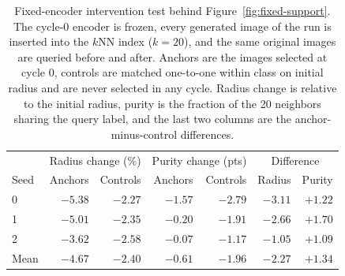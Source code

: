 \begin{table}[t]
\centering
\small
\setlength{\tabcolsep}{5pt}
\caption{Fixed-encoder intervention test behind Figure~\ref{fig:fixed-support}. The cycle-0 encoder is frozen, every generated image of the run is inserted into the $k$NN index ($k=20$), and the same original images are queried before and after. Anchors are the images selected at cycle 0, controls are matched one-to-one within class on initial radius and are never selected in any cycle. Radius change is relative to the initial radius, purity is the fraction of the 20 neighbors sharing the query label, and the last two columns are the anchor-minus-control differences.}
\label{tab:fixed-support}
\begin{tabular}{lrrrrrr}
\toprule
 & \multicolumn{2}{c}{Radius change (\%)} & \multicolumn{2}{c}{Purity change (pts)} & \multicolumn{2}{c}{Difference} \\
Seed & Anchors & Controls & Anchors & Controls & Radius & Purity \\
\midrule
0 & $-5.38$ & $-2.27$ & $-1.57$ & $-2.79$ & $-3.11$ & $+1.22$ \\
1 & $-5.01$ & $-2.35$ & $-0.20$ & $-1.91$ & $-2.66$ & $+1.70$ \\
2 & $-3.62$ & $-2.58$ & $-0.07$ & $-1.17$ & $-1.05$ & $+1.09$ \\
\midrule
Mean & $-4.67$ & $-2.40$ & $-0.61$ & $-1.96$ & $-2.27$ & $+1.34$ \\
\bottomrule
\end{tabular}
\end{table}
